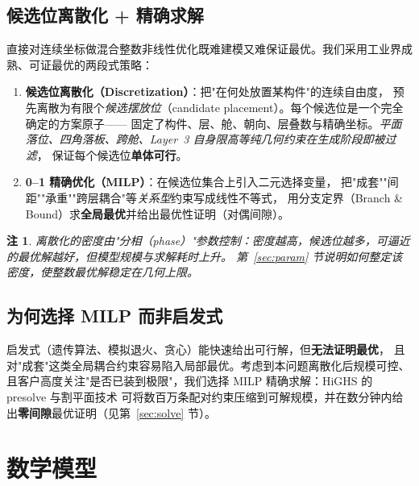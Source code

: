 \documentclass[11pt]{article}
\newtheorem{remark}{注}
\begin{document}
\subsection{候选位离散化 + 精确求解}
\label{sec:strategy}
直接对连续坐标做混合整数非线性优化既难建模又难保证最优。我们采用工业界成熟、可证最优的两段式策略：

\begin{enumerate}[leftmargin=2em,itemsep=3pt]
  \item \textbf{候选位离散化（Discretization）}：把"在何处放置某构件"的连续自由度，
  预先离散为有限个\emph{候选摆放位}（candidate placement）。每个候选位是一个完全确定的方案原子——
  固定了构件、层、舱、朝向、层叠数与精确坐标。\emph{平面落位、四角落板、跨舱、Layer~3 自身限高等纯几何约束在生成阶段即被过滤}，
  保证每个候选位\textbf{单体可行}。
  \item \textbf{0--1 精确优化（MILP）}：在候选位集合上引入二元选择变量，
  把"成套""间距""承重""跨层耦合"等\emph{关系型}约束写成线性不等式，
  用分支定界（Branch \& Bound）求\textbf{全局最优}并给出最优性证明（对偶间隙）。
\end{enumerate}

\begin{remark}
离散化的\emph{密度}由"分相（phase）"参数控制：密度越高，候选位越多，可逼近的最优解越好，但模型规模与求解耗时上升。
第~\ref{sec:param} 节说明如何整定该密度，使整数最优解稳定在几何上限。
\end{remark}

\subsection{为何选择 MILP 而非启发式}
启发式（遗传算法、模拟退火、贪心）能快速给出可行解，但\textbf{无法证明最优}，
且对"成套"这类全局耦合约束容易陷入局部最优。考虑到本问题离散化后规模可控、
且客户高度关注"是否已装到极限"，我们选择 MILP 精确求解：HiGHS 的 presolve 与割平面技术
可将数百万条配对约束压缩到可解规模，并在数分钟内给出\textbf{零间隙}最优证明（见第~\ref{sec:solve} 节）。

\section{数学模型}
\label{sec:model}
\end{document}
